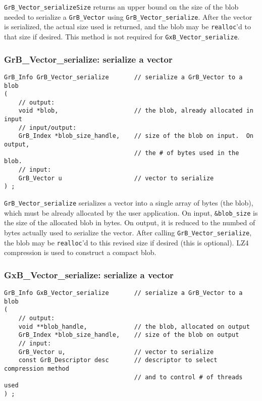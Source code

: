 \documentclass[12pt]{article}
\begin{document}
\verb'GrB_Vector_serializeSize' returns an upper bound on the size of the blob
needed to serialize a \verb'GrB_Vector' using \verb'GrB_Vector_serialize'.
After the vector is serialized, the actual size used is returned, and the blob
may be \verb'realloc''d to that size if desired.
This method is not required for \verb'GxB_Vector_serialize'.

\newpage
\subsubsection{{\sf GrB\_Vector\_serialize:}      serialize a vector}
\label{vector_serialize}

\begin{mdframed}[userdefinedwidth=6in]
{\footnotesize
\begin{verbatim}
GrB_Info GrB_Vector_serialize       // serialize a GrB_Vector to a blob
(
    // output:
    void *blob,                     // the blob, already allocated in input
    // input/output:
    GrB_Index *blob_size_handle,    // size of the blob on input.  On output,
                                    // the # of bytes used in the blob.
    // input:
    GrB_Vector u                    // vector to serialize
) ;
\end{verbatim}
} \end{mdframed}

\verb'GrB_Vector_serialize' serializes a vector into a single array of bytes
(the blob), which must be already allocated by the user application.
On input, \verb'&blob_size' is the size of the allocated blob in bytes.
On output, it is reduced to the numbed of bytes actually used to serialize
the vector.  After calling \verb'GrB_Vector_serialize', the blob may be
\verb'realloc''d to this revised size if desired (this is optional).
LZ4 compression is used to construct a compact blob.

\subsubsection{{\sf GxB\_Vector\_serialize:}      serialize a vector}
\label{vector_serialize_GxB}

\begin{mdframed}[userdefinedwidth=6in]
{\footnotesize
\begin{verbatim}
GrB_Info GxB_Vector_serialize       // serialize a GrB_Vector to a blob
(
    // output:
    void **blob_handle,             // the blob, allocated on output
    GrB_Index *blob_size_handle,    // size of the blob on output
    // input:
    GrB_Vector u,                   // vector to serialize
    const GrB_Descriptor desc       // descriptor to select compression method
                                    // and to control # of threads used
) ;
\end{verbatim}
} \end{mdframed}
\end{document}
